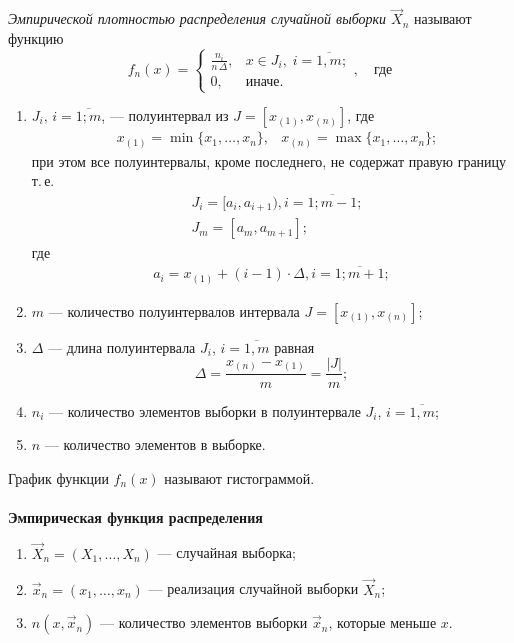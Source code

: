 \begin{defn}
	\emph{Эмпирической плотностью распределения случайной выборки $\vec{X}_n$} называют функцию
	\begin{equation}
	f_n(x) =
	\begin{cases}
	\frac{n_i}{n \, \Delta}, &x \in J_i,\; i = \overline{1, m};\\
	0, &\text{иначе}.
	\end{cases}, \quad \text{где}
	\end{equation}
	\begin{enumerate}
		\item $J_i,\, i = \overline{1; m}$, --- полуинтервал из $J = [x_{(1)}, x_{(n)}]$, где 
		\begin{align}
		&x_{(1)} = \min\{ x_1, \dots, x_n \}, &x_{(n)} = \max\{ x_1, \dots, x_n \};
		\end{align}
		при этом все полуинтервалы, кроме последнего, не содержат правую границу т.\,е.
		\begin{align}
		&J_i = [a_i, a_{i+1}), i = \overline{1; m - 1};
		\\
		&J_{m} = [a_{m}, a_{m+1}];
		\end{align}
		где \begin{align}a_i = x_{(1)} + (i-1)\cdot\Delta, i = \overline{1;m+1};\end{align}
		\item $m$ --- количество полуинтервалов интервала $J = [x_{(1)}, x_{(n)}]$;
		\item $\Delta$ --- длина полуинтервала $J_i$, $i = \overline{1, m}$ равная
		\begin{equation}
		\Delta = \frac{x_{(n)} - x_{(1)}}{m} = \frac{|J|}{m};
		\end{equation}
		\item $n_i$ --- количество элементов выборки в полуинтервале $J_i$, $i = \overline{1, m}$;
		\item $n$ --- количество элементов в выборке.
		
	\end{enumerate}
\end{defn}

\begin{defn}
	График функции $f_n(x)$ называют гистограммой. \\
	\\ \textbf{Эмпирическая функция распределения}
\end{defn}


\begin{enumerate}
	\item $\vec{X}_n = (X_1, \ldots, X_n)$ --- случайная выборка;
	\item $\vec{x}_n = (x_1, \dots, x_n)$ --- реализация случайной выборки $\vec{X}_n$;
	\item $n(x, \vec{x}_n)$ --- количество элементов выборки $\vec{x}_n$, которые меньше $x$.
\end{enumerate}


